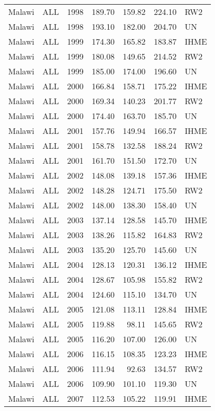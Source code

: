 \begin{longtable}{lllrrrl}
  Malawi & ALL & 1998 & 189.70 & 159.82 & 224.10 & RW2 \\ 
  Malawi & ALL & 1998 & 193.10 & 182.00 & 204.70 & UN \\ 
  Malawi & ALL & 1999 & 174.30 & 165.82 & 183.87 & IHME \\ 
  Malawi & ALL & 1999 & 180.08 & 149.65 & 214.52 & RW2 \\ 
  Malawi & ALL & 1999 & 185.00 & 174.00 & 196.60 & UN \\ 
  Malawi & ALL & 2000 & 166.84 & 158.71 & 175.22 & IHME \\ 
  Malawi & ALL & 2000 & 169.34 & 140.23 & 201.77 & RW2 \\ 
  Malawi & ALL & 2000 & 174.40 & 163.70 & 185.70 & UN \\ 
  Malawi & ALL & 2001 & 157.76 & 149.94 & 166.57 & IHME \\ 
  Malawi & ALL & 2001 & 158.78 & 132.58 & 188.24 & RW2 \\ 
  Malawi & ALL & 2001 & 161.70 & 151.50 & 172.70 & UN \\ 
  Malawi & ALL & 2002 & 148.08 & 139.18 & 157.36 & IHME \\ 
  Malawi & ALL & 2002 & 148.28 & 124.71 & 175.50 & RW2 \\ 
  Malawi & ALL & 2002 & 148.00 & 138.30 & 158.40 & UN \\ 
  Malawi & ALL & 2003 & 137.14 & 128.58 & 145.70 & IHME \\ 
  Malawi & ALL & 2003 & 138.26 & 115.82 & 164.83 & RW2 \\ 
  Malawi & ALL & 2003 & 135.20 & 125.70 & 145.60 & UN \\ 
  Malawi & ALL & 2004 & 128.13 & 120.31 & 136.12 & IHME \\ 
  Malawi & ALL & 2004 & 128.67 & 105.98 & 155.82 & RW2 \\ 
  Malawi & ALL & 2004 & 124.60 & 115.10 & 134.70 & UN \\ 
  Malawi & ALL & 2005 & 121.08 & 113.11 & 128.84 & IHME \\ 
  Malawi & ALL & 2005 & 119.88 & 98.11 & 145.65 & RW2 \\ 
  Malawi & ALL & 2005 & 116.20 & 107.00 & 126.00 & UN \\ 
  Malawi & ALL & 2006 & 116.15 & 108.35 & 123.23 & IHME \\ 
  Malawi & ALL & 2006 & 111.94 & 92.63 & 134.57 & RW2 \\ 
  Malawi & ALL & 2006 & 109.90 & 101.10 & 119.30 & UN \\ 
  Malawi & ALL & 2007 & 112.53 & 105.22 & 119.91 & IHME \\ 

\end{longtable}
